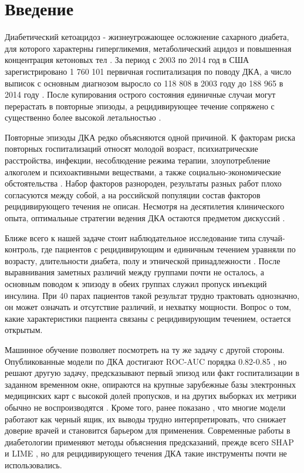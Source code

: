 \documentclass[pdflatex,sn-basic,Numbered]{sn-jnl}
\begin{document}

\maketitle

\section{Введение}\label{sec1}

Диабетический кетоацидоз - жизнеугрожающее осложнение сахарного диабета, для которого характерны гипергликемия, метаболический ацидоз и повышенная концентрация кетоновых тел \cite{ref1}. За период с 2003 по 2014 год в США зарегистрировано 1 760 101 первичная госпитализация по поводу ДКА, а число выписок с основным диагнозом выросло со 118 808 в 2003 году до 188 965 в 2014 году \cite{ref2}. После купирования острого состояния единичные случаи могут перерастать в повторные эпизоды, а рецидивирующее течение сопряжено с существенно более высокой летальностью \cite{ref3,ref4}.

Повторные эпизоды ДКА редко объясняются одной причиной. К факторам риска повторных госпитализаций относят молодой возраст, психиатрические расстройства, инфекции, несоблюдение режима терапии, злоупотребление алкоголем и психоактивными веществами, а также социально-экономические обстоятельства \cite{ref5,ref6,ref7}. Набор факторов разнороден, результаты разных работ плохо согласуются между собой, а на российской популяции состав факторов рецидивирующего течения не описан. Несмотря на десятилетия клинического опыта, оптимальные стратегии ведения ДКА остаются предметом дискуссий \cite{ref8}.

Ближе всего к нашей задаче стоит наблюдательное исследование типа случай-контроль, где пациентов с рецидивирующим и единичным течением уравняли по возрасту, длительности диабета, полу и этнической принадлежности \cite{ref9}. После выравнивания заметных различий между группами почти не осталось, а основным поводом к эпизоду в обеих группах служил пропуск инъекций инсулина. При 40 парах пациентов такой результат трудно трактовать однозначно, он может означать и отсутствие различий, и нехватку мощности. Вопрос о том, какие характеристики пациента связаны с рецидивирующим течением, остается открытым.

Машинное обучение позволяет посмотреть на ту же задачу с другой стороны. Опубликованные модели по ДКА достигают ROC-AUC порядка 0.82-0.85 \cite{ref10,ref11}, но решают другую задачу, предсказывают первый эпизод или факт госпитализации в заданном временном окне, опираются на крупные зарубежные базы электронных медицинских карт с высокой долей пропусков, и на других выборках их метрики обычно не воспроизводятся \cite{ref11}. Кроме того, ранее показано \cite{ref12,ref13}, что многие модели работают как черный ящик, их выводы трудно интерпретировать, что снижает доверие врачей и становится барьером для применения. Современные работы в диабетологии применяют методы объяснения предсказаний, прежде всего SHAP и LIME \cite{ref14,ref15}, но для рецидивирующего течения ДКА такие инструменты почти не использовались.
\end{document}
